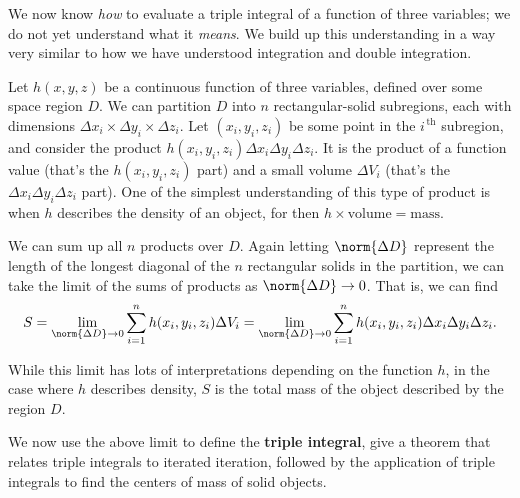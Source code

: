We now know \textit{how} to evaluate a triple integral of a function of three variables; we do not yet understand what it \textit{means}. We build up this understanding in a way very similar to how we have understood integration and double integration.

Let $h(x,y,z)$ be a continuous function of three variables, defined over some space region $D$. We can partition $D$ into $n$ rectangular-solid subregions, each with dimensions $\Delta x_i\times\Delta y_i\times\Delta z_i$. Let $(x_i,y_i,z_i)$ be some point in the $i^{\,\text{th}}$ subregion, and consider the product $h(x_i,y_i,z_i)\Delta x_i\Delta y_i\Delta z_i$. It is the product of a function value (that's the $h(x_i,y_i,z_i)$ part) and a small volume $\Delta V_i$ (that's the $\Delta x_i\Delta y_i\Delta z_i$ part). One of the simplest understanding of this type of product is when $h$ describes the density of an object, for then $h\times\text{volume}=\text{mass}$.

We can sum up all $n$ products over $D$. Again letting $\norm{\Delta D}$ represent the length of the longest diagonal of the $n$ rectangular solids in the partition, we can take the limit of the sums of products as $\norm{\Delta D}\to 0$. That is, we can find
\[S = \lim_{\norm{\Delta D}\to 0} \sum_{i=1}^n h(x_i,y_i,z_i)\Delta V_i=\lim_{\norm{\Delta D}\to 0} \sum_{i=1}^n h(x_i,y_i,z_i)\Delta x_i\Delta y_i\Delta z_i.\]

While this limit has lots of interpretations depending on the function $h$, in the case where $h$ describes density, $S$ is the total mass of the object described by the region $D$.

We now use the above limit to define the \textbf{triple integral}, give a theorem that relates triple integrals to iterated iteration, followed by the application of triple integrals to find the centers of mass of solid objects.


